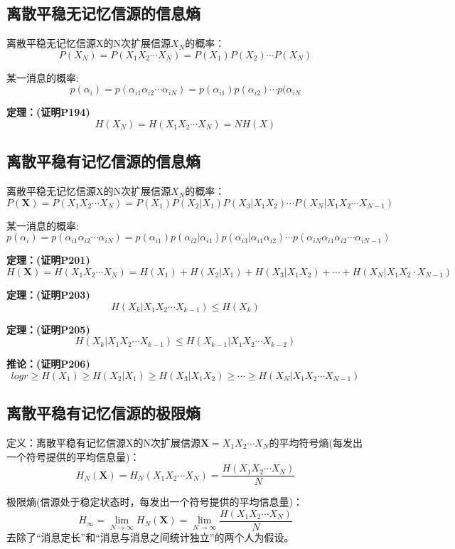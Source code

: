 \documentclass[UTF8]{ctexart} %
\begin{document}
		\subsection{离散平稳无记忆信源的信息熵}
			离散平稳无记忆信源X的N次扩展信源$X_N$的概率：
			\[P(X_N) = P(X_1X_2\cdots X_N) = P(X_1)P(X_2)\cdots P(X_N)\]
			
			某一消息的概率:
			\[p(\alpha_i) = p(\alpha_{i1}\alpha_{i2}\cdots\alpha_{iN}) = p(\alpha_{i1})p(\alpha_{i2})\cdots p(\alpha_{iN}\]
			
			\textbf{定理：(证明P194)}
			\[ H(X_N) =H(X_1X_2\cdots X_N) = NH(X) \]
		\subsection{离散平稳有记忆信源的信息熵}
			离散平稳无记忆信源X的N次扩展信源$X_N$的概率：
			\[P(\bm{X}) = P(X_1X_2\cdots X_N) = P(X_1)P(X_2|X_1)P(X_3|X_1X_2)\cdots P(X_N|X_1X_2\cdots X_{N-1})\]
			
			某一消息的概率:
			\[p(\alpha_i) = p(\alpha_{i1}\alpha_{i2}\cdots\alpha_{iN}) = p(\alpha_{i1})p(\alpha_{i2}|\alpha_{i1})p(\alpha_{i3}|\alpha_{i1}\alpha_{i2})\cdots p(\alpha_{iN}\alpha_{i1}\alpha_{i2}\cdots\alpha_{iN-1})\]
			
			\textbf{定理：(证明P201)}
			\[ H(\bm{X}) =H(X_1X_2\cdots X_N) =H(X_1)+H(X_2|X_1)+H(X_3|X_1X_2)+\cdots+H(X_N|X_1X_2\cdot X_{N-1})\]
			
			\textbf{定理：(证明P203)}
			\[H(X_k|X_1X_2\cdots X_{k-1}) \leq H(X_k)\]
		
			\textbf{定理：(证明P205)}
			\[H(X_k|X_1X_2\cdots X_{k-1}) \leq H(X_{k-1}|X_1X_2\cdots X_{k-2})\]
			
			\textbf{推论：(证明P206)}
			\[logr \geq H(X_1) \geq H(X_2|X_1) \geq H(X_3|X_1X_2)\geq\cdots\geq H(X_N|X_1X_2\cdots X_{N-1})\]
			
			
		\subsection{离散平稳有记忆信源的极限熵}
			定义：离散平稳有记忆信源X的N次扩展信源$\bm{X} = X_1X_2\cdots X_N$的平均符号熵(每发出一个符号提供的平均信息量)：
			\[H_N(\bm{X}) = H_N(X_1X_2\cdots X_N) = \frac{ H(X_1X_2\cdots X_N)}{N}\]
			
			极限熵(信源处于稳定状态时，每发出一个符号提供的平均信息量)：
			\[H_\infty = \lim_{N\rightarrow\infty}H_N(\bm{X}) =\lim_{N\rightarrow\infty} \frac{ H(X_1X_2\cdots X_N)}{N}\]
			去除了“消息定长”和“消息与消息之间统计独立”的两个人为假设。
			
\end{document}
